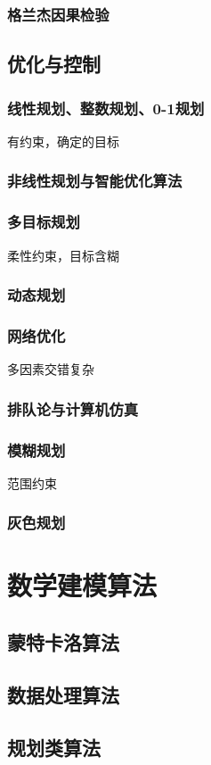\documentclass[openany]{progbookcn}
\begin{document}
\section{格兰杰因果检验}
\chapter{优化与控制}
\section{线性规划、整数规划、0-1规划}
有约束，确定的目标
\section{非线性规划与智能优化算法}
\section{多目标规划}
柔性约束，目标含糊
\section{动态规划}

\section{网络优化}
多因素交错复杂
\section{排队论与计算机仿真}
\section{模糊规划}
范围约束
\section{灰色规划}
\part{数学建模算法}
\chapter{蒙特卡洛算法}
\chapter{数据处理算法}
\chapter{规划类算法}
\end{document}
